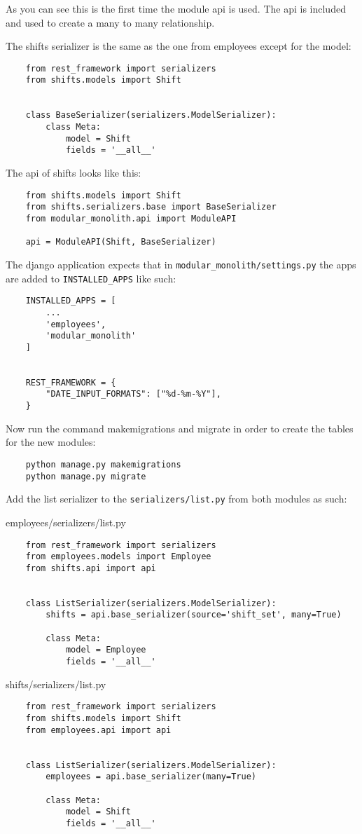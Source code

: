 As you can see this is the first time the module api is used. The api is included and used to create a many to many relationship.

The shifts serializer is the same as the one from employees except for the model:
\begin{verbatim}
    from rest_framework import serializers
    from shifts.models import Shift


    class BaseSerializer(serializers.ModelSerializer):
        class Meta:
            model = Shift
            fields = '__all__'
\end{verbatim}

The api of shifts looks like this:
\begin{verbatim}
    from shifts.models import Shift
    from shifts.serializers.base import BaseSerializer
    from modular_monolith.api import ModuleAPI

    api = ModuleAPI(Shift, BaseSerializer)
\end{verbatim}

The django application expects that in \texttt{modular\_monolith/settings.py} the apps are added to \texttt{INSTALLED\_APPS} like such:
\begin{verbatim}
    INSTALLED_APPS = [
        ...
        'employees',
        'modular_monolith'
    ]


    REST_FRAMEWORK = {
        "DATE_INPUT_FORMATS": ["%d-%m-%Y"],
    }
\end{verbatim}

Now run the command makemigrations and migrate in order to create the tables for the new modules:
\begin{verbatim}
    python manage.py makemigrations
    python manage.py migrate
\end{verbatim}

Add the list serializer to the \texttt{serializers/list.py} from both modules as such:

employees/serializers/list.py
\begin{verbatim}
    from rest_framework import serializers
    from employees.models import Employee
    from shifts.api import api


    class ListSerializer(serializers.ModelSerializer):
        shifts = api.base_serializer(source='shift_set', many=True)

        class Meta:
            model = Employee
            fields = '__all__'
\end{verbatim}

shifts/serializers/list.py
\begin{verbatim}
    from rest_framework import serializers
    from shifts.models import Shift
    from employees.api import api


    class ListSerializer(serializers.ModelSerializer):
        employees = api.base_serializer(many=True)

        class Meta:
            model = Shift
            fields = '__all__'
\end{verbatim}

